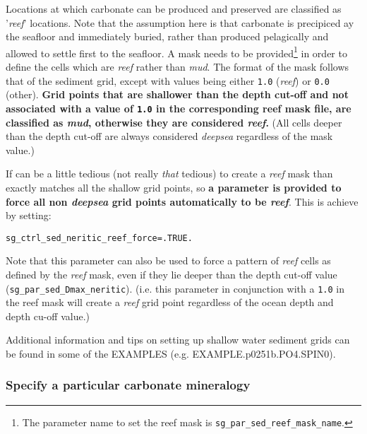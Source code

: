 \vspace{1mm}
Locations at which  carbonate can be produced and preserved
are classified
as '\textit{reef}' locations. Note that the assumption here is that carbonate is precipiced ay the seafloor and immediately buried, rather than produced pelagically and  allowed to settle first to the seafloor.
A mask needs to be provided\footnote{The parameter name to set the reef mask is \texttt{sg\_par\_sed\_reef\_mask\_name}.} in order to define the cells which are \textit{reef} rather than \textit{mud}. The format of the mask follows that of the sediment grid, except with values being either \texttt{1.0} (\textit{reef}) or \texttt{0.0} (other).  \textbf{Grid points that are shallower than the depth cut-off and not associated with a value of \texttt{1.0} in the corresponding reef mask file, are classified as \textit{mud}, otherwise they are considered \textit{reef}.} (All cells deeper than the depth cut-off are always considered \textit{deepsea} regardless of the mask value.)

\vspace{1mm}
If can be a little tedious (not really \textit{that} tedious) to create a \textit{reef} mask than exactly matches
all the shallow grid points, so \textbf{a parameter is provided to force all non \textit{deepsea} grid points automatically to be \textit{reef}}. This is achieve by setting:
\vspace{-1mm}\small\begin{verbatim}
sg_ctrl_sed_neritic_reef_force=.TRUE.
\end{verbatim}\normalsize\vspace{-1mm}

Note that this parameter can also be used to force a pattern of \textit{reef} cells as defined by the \textit{reef} mask, even if they lie deeper than the depth cut-off value (\texttt{sg\_par\_sed\_Dmax\_neritic}). (i.e. this parameter in conjunction with a \texttt{1.0} in the reef mask will create a \textit{reef} grid point regardless of the ocean depth and depth cu-off value.)

\vspace{1mm}
Additional information and tips on setting up shallow water sediment grids can be found in some of the EXAMPLES (e.g. \textsf{\footnotesize EXAMPLE.p0251b.PO4.SPIN0}).

%
\newpage
\subsubsection{Specify a particular carbonate mineralogy}\label{subsec:specify_a_particular_carbonate_mineralogy}
\vspace{1mm}

